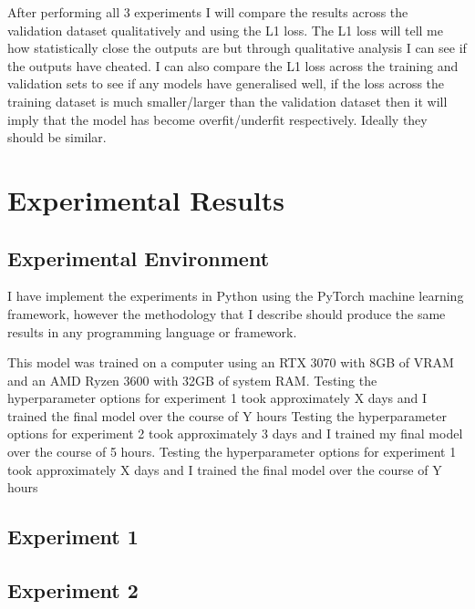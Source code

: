 \documentclass{UoYCSproject}
\begin{document}
After performing all 3 experiments I will compare the results across the validation dataset qualitatively and using the L1 loss. The L1 loss will tell me how statistically close the outputs are but through qualitative analysis I can see if the outputs have cheated. 
I can also compare the L1 loss across the training and validation sets to see if any models have generalised well, if the loss across the training dataset is much smaller/larger than the validation dataset then it will imply that the model has become overfit/underfit respectively. Ideally they should be similar. 

\newpage{}

\chapter{Experimental Results}



\section{Experimental Environment}

I have implement the experiments in Python using the PyTorch machine learning framework, however the methodology that I describe should produce the same results in any programming language or framework.

This model was trained on a computer using an RTX 3070 with 8GB of VRAM and an AMD Ryzen 3600 with 32GB of system RAM.
Testing the hyperparameter options for experiment 1 took approximately X days and I trained the final model over the course of Y hours
Testing the hyperparameter options for experiment 2 took approximately 3 days and I trained my final model over the course of 5 hours.
Testing the hyperparameter options for experiment 1 took approximately X days and I trained the final model over the course of Y hours


\section{Experiment 1}

\section{Experiment 2}
\end{document}
